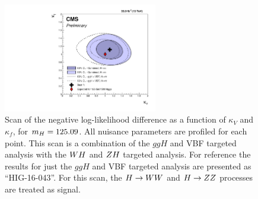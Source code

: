 \begin{figure}[!ht]
 \begin{center}
  \includegraphics[width=0.60\textwidth]{higgs_to_taus_vh/plots/combined/kFkV_HIG-18-007_plus_HIG-16-043_comp_up.pdf}
 \end{center}
 \caption{Scan of the negative 
 log-likelihood difference as a function of $\kappa_V$ and $\kappa_f$, for 
 $m_{H} = 125.09$\GeV.  All nuisance parameters are profiled for each point. 
 This scan is a combination of the $ggH$ and VBF targeted analysis with the 
 $WH$ and $ZH$ targeted analysis. For reference the results for just
 the $ggH$ and VBF targeted analysis are presented as ``HIG-16-043''.
 For this scan, the $H\to WW$ and $H\to ZZ$ processes 
 are treated as signal.
 }
 \label{fig:cmb_kFkV}
\end{figure}



\clearpage
